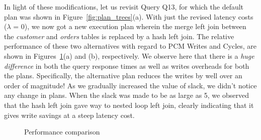 In light of these modifications, let
us revisit Query Q13, for which the default plan was shown in
Figure~\ref{fig:plan_trees}(a). With just the revised latency costs ($\lambda$ = 0), we now got a new execution plan wherein the
merge left join between the \textit{customer} and \textit{orders}
tables is replaced by a hash left join.
The relative performance of
these two alternatives with regard to PCM Writes and Cycles, are shown
in Figures~\ref{fig:perf_comp}(a) and (b), respectively. We observe
here that there is a \emph{huge difference} in both the query response times as well as writes overheads for both the plans.
Specifically, the alternative plan reduces the writes by well over an
order of magnitude!
As we gradually increased the value of slack, we didn't notice any change in plans. When the slack was made to be as large as 5, we observed that the hash left join gave way to nested loop left join, clearly indicating that it gives write savings at a steep latency cost.


\begin{figure}[htbp]
\centering
	

\caption{Performance comparison}
\label{fig:perf_comp}
\end{figure}



